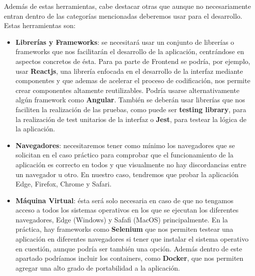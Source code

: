 \begin{enumerate}
    Además de estas herramientas, cabe destacar otras que aunque no necesariamente entran dentro de las categorías mencionadas deberemos usar para el desarrollo. Estas herramientas son:

    \begin{itemize}
        \item \textbf{Librerías y Frameworks}: se necesitará usar un conjunto de librerías o frameworks que nos facilitarán el desarrollo de la aplicación, centrándose en aspectos concretos de ésta. Para pa parte de Frontend se podría, por ejemplo, usar \textbf{Reactjs}, una librería enfocada en el desarrollo de la interfaz mediante componentes y que ademas de acelerar el proceso de codificación, nos permite crear componentes altamente reutilizables. Podría usarse alternativamente algún framework como \textbf{Angular}. También se deberán usar librerías que nos faciliten la realización de las pruebas, como puede ser \textbf{testing library}, para la realización de test unitarios de la interfaz o \textbf{Jest}, para testear la lógica de la aplicación.

        \item \textbf{Navegadores}: necesitaremos tener como mínimo los navegadores que se solicitan en el caso práctico para comprobar que el funcionamiento de la aplicación es correcto en todos y que visualmente no hay discordancias entre un navegador u otro. En nuestro caso, tendremos que probar la aplicación Edge, Firefox, Chrome y Safari.

        \item \textbf{Máquina Virtual}: ésta será solo necesaria en caso de que no tengamos acceso a todos los sistemas operativos en los que se ejecutan los diferentes navegadores, Edge (Windows) y Safafi (MacOS) principalmente. En la práctica, hay frameworks como \textbf{Selenium} que nos permiten testear una aplicación en diferentes navegadores si tener que instalar el sistema operativo en cuestión, aunque podría ser también una opción. Además dentro de este apartado podríamos incluir los containers, como \textbf{Docker}, que nos permiten agregar una alto grado de portabilidad a la aplicación.
    \end{itemize}

\end{enumerate}

%
%

